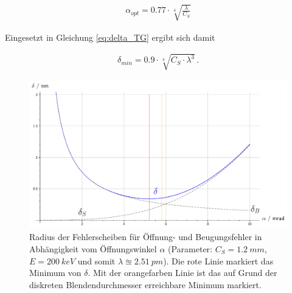 \documentclass[
	paper=a4,				%
	twoside=true,			%
	BCOR=6mm,				%
	fontsize=12pt,			%
	pagesize=auto,			%
	numbers=noenddot,		%
	bibliography=totoc,		%
	draft=false
]{scrartcl}
\begin{document}
\begin{align}
\alpha_{opt} = \num{0,77} \cdot \sqrt[4]{\frac{\lambda}{C_S}} \label{eq:alpha_opt}
\end{align}

Eingesetzt in Gleichung \ref{eq:delta_TG} ergibt sich damit

\begin{align}
\delta_{min} = \num{0,9} \cdot \sqrt[4]{C_S\cdot \lambda^3}\,. \label{eq:delta_min}
\end{align}

\begin{figure}
	\centering
	\includegraphics[width=1\linewidth]{../Jupyter-Notebooks/AnhangC/Bilder/delta_TG}
	\caption{Radius der Fehlerscheiben für Öffnung- und Beugungsfehler in Abhängigkeit vom Öffnungswinkel $\alpha$ (Parameter: $C_S = \SI{1,2}{mm}$, $E=\SI{200}{keV}$ und somit $\lambda\approxeq \SI{2,51}{pm}$). Die rote Linie markiert das Minimum von $\delta$. Mit der orangefarben Linie ist das auf Grund der diskreten Blendendurchmesser erreichbare Minimum markiert.}
	\label{fig:delta_TG}
\end{figure}
\end{document}
